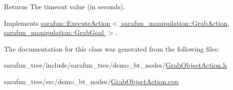 \begin{DoxyReturn}{Returns}
The timeout value (in seconds). 
\end{DoxyReturn}


Implements \hyperlink{classsarafun_1_1ExecuteAction_aba6cfa8a8ce19e735eb6394424df6d17}{sarafun\-::\-Execute\-Action$<$ sarafun\-\_\-manipulation\-::\-Grab\-Action, sarafun\-\_\-manipulation\-::\-Grab\-Goal $>$}.



The documentation for this class was generated from the following files\-:\begin{DoxyCompactItemize}
\item 
sarafun\-\_\-tree/include/sarafun\-\_\-tree/demo\-\_\-bt\-\_\-nodes/\hyperlink{GrabObjectAction_8h}{Grab\-Object\-Action.\-h}\item 
sarafun\-\_\-tree/src/demo\-\_\-bt\-\_\-nodes/\hyperlink{GrabObjectAction_8cpp}{Grab\-Object\-Action.\-cpp}\end{DoxyCompactItemize}
